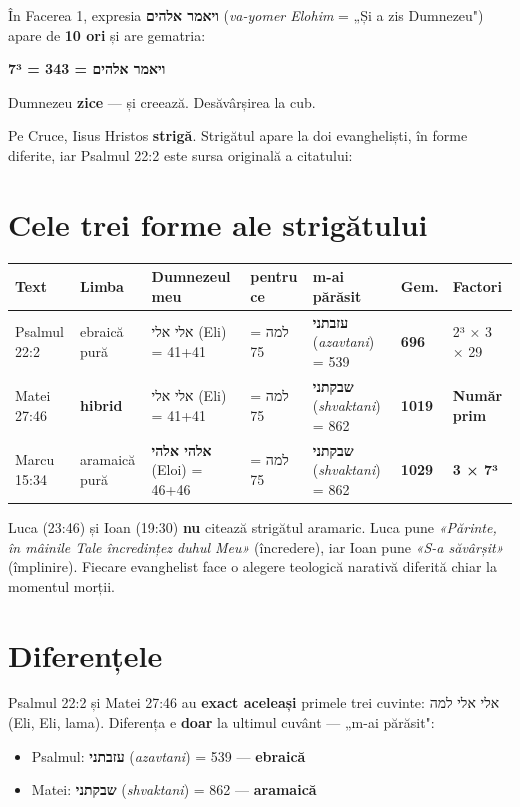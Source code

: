 \documentclass[12pt,a4paper,twoside,openany]{book}
\begin{document}
În Facerea 1, expresia \textbf{ויאמר אלהים} (\textit{va-yomer Elohim} = „Și a zis Dumnezeu") apare de \textbf{10 ori} și are gematria:

\begin{center}
\textbf{ויאמר אלהים = 343 = 7³}
\end{center}

Dumnezeu \textbf{zice} — și creează. Desăvârșirea la cub.

Pe Cruce, Iisus Hristos \textbf{strigă}. Strigătul apare la doi evangheliști, în forme diferite, iar Psalmul 22:2 este sursa originală a citatului:

\section{Cele trei forme ale strigătului}

\footnotesize
\begin{tabular}{|p{1.8cm}|p{1.6cm}|p{2.2cm}|l|p{2.2cm}|l|p{2cm}|}
\hline
\textbf{Text} & \textbf{Limba} & \textbf{Dumnezeul meu} & \textbf{pentru ce} & \textbf{m-ai părăsit} & \textbf{Gem.} & \textbf{Factori} \\
\hline
Psalmul 22:2 & ebraică pură & אלי אלי (Eli) = 41+41 & למה = 75 & \textbf{עזבתני} (\textit{azavtani}) = 539 & \textbf{696} & 2³ × 3 × 29 \\
\hline
Matei 27:46 & \textbf{hibrid} & אלי אלי (Eli) = 41+41 & למה = 75 & \textbf{שבקתני} (\textit{shvaktani}) = 862 & \textbf{1019} & \textbf{Număr prim} \\
\hline
Marcu 15:34 & aramaică pură & \textbf{אלהי אלהי} (Eloi) = 46+46 & למה = 75 & \textbf{שבקתני} (\textit{shvaktani}) = 862 & \textbf{1029} & \textbf{3 × 7³} \\
\hline
\end{tabular}

\bigskip

Luca (23:46) și Ioan (19:30) \textbf{nu} citează strigătul aramaric. Luca pune \textit{«Părinte, în mâinile Tale încredințez duhul Meu»} (încredere), iar Ioan pune \textit{«S-a săvârșit»} (împlinire). Fiecare evanghelist face o alegere teologică narativă diferită chiar la momentul morții.

\section{Diferențele}

Psalmul 22:2 și Matei 27:46 au \textbf{exact aceleași} primele trei cuvinte: אלי אלי למה (Eli, Eli, lama). Diferența e \textbf{doar} la ultimul cuvânt — „m-ai părăsit":
\begin{itemize}
\item Psalmul: \textbf{עזבתני} (\textit{azavtani}) = 539 — \textbf{ebraică}
\item Matei: \textbf{שבקתני} (\textit{shvaktani}) = 862 — \textbf{aramaică}
\end{itemize}
\end{document}
